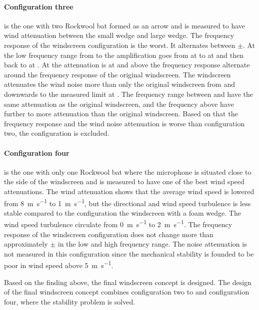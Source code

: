\paragraph{Configuration three} is the one with two Rockwool bat formed as an arrow and is measured to have wind attenuation between the small wedge and large wedge. The frequency response of the windscreen configuration is the worst. It alternates between $\pm$. At the low frequency range from  to  the amplification goes from  at  to  at  and then back to   at . At   the attenuation is at  and above the frequency response alternate around the frequency response of the original windscreen. The windscreen attenuates the wind noise  more than only the original windscreen from  and downwards to the measured limit at . The frequency range between  and  have the same attenuation as the original windscreen, and the frequency above have further  to  more attenuation than the original windscreen. Based on that the frequency response and the wind noise attenuation is worse than configuration two, the configuration is excluded.

\paragraph{Configuration four} is the one with only one Rockwool bat where the microphone is situated close to the side of the windscreen and is measured to have one of the best wind speed attenuations. The wind attenuation shows that the average wind speed is lowered from \SI{8}{\meter\per\second} to \SI{1}{\meter\per\second}, but the directional and wind speed turbulence is less stable compared to the configuration the windscreen with a foam wedge. The wind speed turbulence circulate from \SI{0}{\meter\per\second} to \SI{2}{\meter\per\second}. The frequency response of the windscreen configuration does not change more than approximately $\pm$ in the low and high frequency range. The noise attenuation is not measured in this configuration since the mechanical stability is founded to be poor in wind speed above \SI{5}{\meter\per\second}.




Based on the finding above, the final windscreen concept is designed. The design of the final windscreen concept combines configuration two to and configuration four, where the stability problem is solved. 

